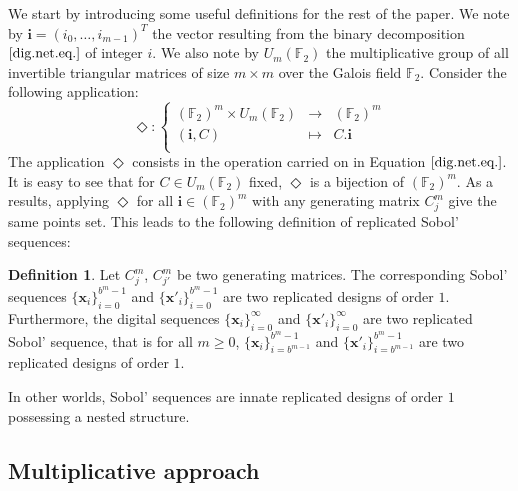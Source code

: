 \documentclass[]{elsarticle}
\theoremstyle{definition}
\newtheorem{defin}{Definition}
\newcommand{\bvec}[1]{\boldsymbol{#1}}
\newcommand{\vx}{\bvec{x}}
\newcommand{\vi}{\bvec{i}}
\begin{document}
We start by introducing some useful definitions for the rest of the paper. We note by $\vi=(i_{0},\dots,i_{m-1})^T$ the vector resulting from the binary decomposition $\eqref{dig.net.eq.}$ of integer $i$. We also note by $U_m(\mathbb{F}_2)$ the multiplicative group of all invertible triangular matrices of size $m\times m$ over the Galois field $\mathbb{F}_2$. Consider the following application:
\begin{equation*}
 \Diamond \colon \left\lbrace \begin{array}{ccccc} (\mathbb{F}_2)^m \times U_m(\mathbb{F}_2) & \to & (\mathbb{F}_2)^m \\
  (\vi,C) & \mapsto &  C . \vi \\
\end{array} \right.
\label{model}
\end{equation*}
The application $\Diamond$ consists in the operation carried on in Equation $\eqref{dig.net.eq.}$. It is easy to see that for $C \in U_m(\mathbb{F}_2)$ fixed, $\Diamond$ is a bijection of $(\mathbb{F}_2)^m$. As a results, applying $\Diamond$ for all $\vi \in (\mathbb{F}_2)^m$ with any generating matrix $C_j^m$ give the same points set. This leads to the following definition of replicated Sobol' sequences:
\begin{defin}
Let $C_j^m$, $C_{j'}^m$ be two generating matrices. The corresponding Sobol' sequences $\{\vx_i\}_{i=0}^{b^m-1}$ and $\{\vx'_i\}_{i=0}^{b^m-1}$ are two replicated designs of order $1$. Furthermore, the digital sequences $\{{\vx}_i\}_{i=0}^{\infty}$ and $\{{\vx'}_i\}_{i=0}^{\infty}$ are two replicated Sobol' sequence, that is for all $m \geq 0$, $\{{\vx}_i\}_{i=b^{m-1}}^{b^m-1}$ and $\{{\vx'}_i\}_{i=b^{m-1}}^{b^m-1}$ are two replicated designs of order $1$.
\end{defin}
In other worlds, Sobol' sequences are innate replicated designs of order $1$ possessing a nested structure.


\subsection{Multiplicative approach}
%
\end{document}
